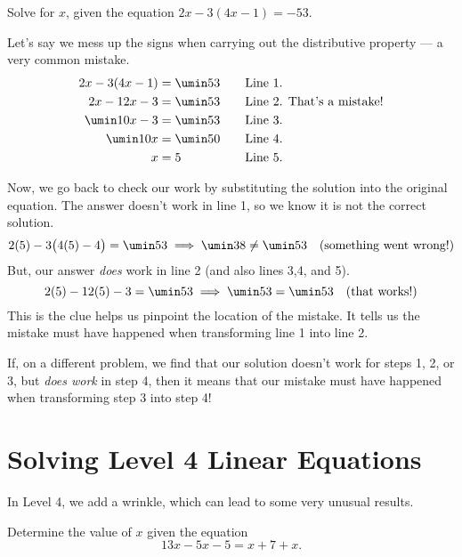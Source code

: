 \begin{boxedex}
Solve for $x$, given the equation $2x-3(4x-1)=-53$.

Let's say we mess up the signs when carrying out the distributive property --- a very common mistake.
\[\begin{aligned}
2x - 3(4x-1) &= \umin53
&& \text{\quad Line 1.}
\\
2x - 12x - 3 &= \umin53
&& \text{\quad Line 2. That's a mistake!}
\\
\umin10x - 3 &= \umin53
&& \text{\quad Line 3.}
\\
\umin10x &= \umin50
&& \text{\quad Line 4.}
\\
x &= 5
&& \text{\quad Line 5.}
\end{aligned}\]

Now, we go back to check our work by substituting the solution into the original equation. The answer doesn't work in line 1, so we know it is not the correct solution. \[2(5) - 3\bigl(4(5)-4\bigr) = \umin53 \implies \umin38 \neq \umin53 \text{\quad(something went wrong!)}\]
But, our answer \textit{does} work in line 2 (and also lines 3,4, and 5).
\[2(5) - 12(5) - 3 = \umin53 \implies \umin53 = \umin53 \text{\quad(that works!)}\]
This is the clue helps us pinpoint the location of the mistake. It tells us the mistake must have happened when transforming line 1 into line 2.

If, on a different problem, we find that our solution doesn't work for steps 1, 2, or 3, but \textit{does work} in step 4, then it means that our mistake must have happened when transforming step 3 into step 4!
\end{boxedex} 

\section{Solving Level 4 Linear Equations}
\label{sec:linearlevel4}

In Level 4, we add a wrinkle, which can lead to some very unusual results.

\begin{boxedexplore}
\end{boxedexplore}

\begin{boxedexplore}
Determine the value of $x$ given the equation \[13x-5x-5=x+7+x.\]
\end{boxedexplore} %

